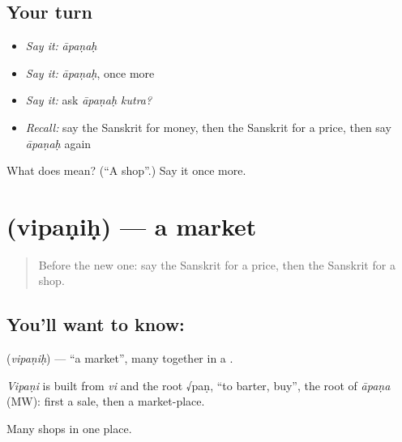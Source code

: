 \subsection*{Your turn}
\begin{itemize}
\raggedright
  \item \emph{Say it:} \emph{āpaṇaḥ}
  \item \emph{Say it:} \emph{āpaṇaḥ}, once more
  \item \emph{Say it:} ask \emph{āpaṇaḥ kutra?}
  \item \emph{Recall:} say the Sanskrit for money, then the Sanskrit for a price, then say \emph{āpaṇaḥ} again
\end{itemize}

\begin{tcolorbox}[breakable,colback=teal!4,colframe=teal!35!black,title={Before you move on}]
What does  mean? (\textquotedblleft{}A shop\textquotedblright{}.) Say it once more.
\end{tcolorbox}
\section[\texorpdfstring{\sk{विपणिः} (vipaṇiḥ)}{विपणिः (vipaṇiḥ)}]{ (vipaṇiḥ) — a market}

\label{lesson:SA-C74-market}



\begin{quote}
Before the new one: say the Sanskrit for a price, then the Sanskrit for a shop.
\end{quote}

\subsection*{You'll want to know: }
\textbf{} (\emph{vipaṇiḥ}) — \textquotedblleft{}a market\textquotedblright{}, many \textbf{} together in a \textbf{}.

\begin{cousinweb}
\emph{Vipaṇi} is built from \emph{vi} and the root √paṇ, \textquotedblleft{}to barter, buy\textquotedblright{}, the root of \emph{āpaṇa} (MW): first a sale, then a market-place.
\end{cousinweb}

\begin{grammarlens}[title={What you've built}]
Many shops in one place.
\end{grammarlens}

